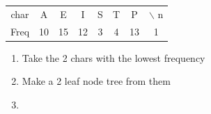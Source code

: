 \documentclass[12pt]{article}
\begin{document}
\begin{enumerate}[1.]
\begin{itemize}
        \begin{tabular}{|c|c|c|c|c|c|c|c|}
            \hline
            char & A & E & I & S & T & P & $\backslash$ n\\
            Freq & 10 & 15 & 12 & 3 & 4& 13 & 1\\
            \hline
        \end{tabular}

        \begin{enumerate}[1.]
            \item Take the 2 chars with the lowest frequency
            \item Make a 2 leaf node tree from them
            \item
        \end{enumerate}
    \end{itemize}

\end{enumerate}
\end{document}
